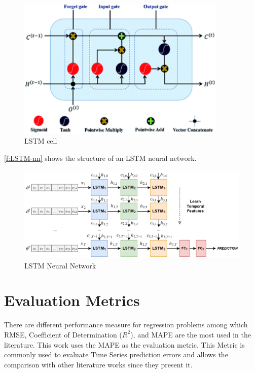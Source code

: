 \begin{figure}[h]
\centering
\includegraphics[width=10cm]{figures/Ch2/LSTM_cell.pdf}
\caption{LSTM cell \cite{Guo2020}}
\label{f:LSTM-cell}
\end{figure}

\autoref{f:LSTM-nn} shows the structure of an \ac{LSTM} neural network.

\begin{figure}[h]
\centering
\includegraphics[width=\linewidth]{figures/Ch2/LSTM_nn.pdf}
\caption{LSTM Neural Network \cite{zapata2019}}
\label{f:LSTM-nn}
\end{figure}



\section{Evaluation Metrics}
\label{sec:section_Example}

There are different performance measure for regression problems among which \ac{RMSE}, Coefficient of Determination (\begin{math}R^2\end{math}), and \ac{MAPE} are the most used in the literature. This work uses the \ac{MAPE} as the evaluation metric. This Metric is commonly used to evaluate Time Series prediction errors and allows the comparison with other literature works since they present it.


